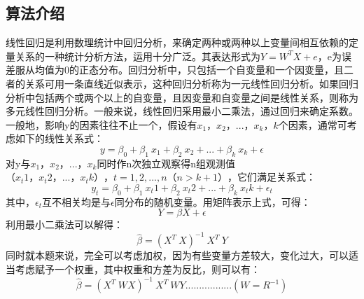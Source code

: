 \documentclass{ctexart}
\begin{document}
\subsection{算法介绍}
线性回归是利用数理统计中回归分析，来确定两种或两种以上变量间相互依赖的定量关系的一种统计分析方法，运用十分广泛。其表达形式为$Y = W^T X + e$，e为误差服从均值为0的正态分布。回归分析中，只包括一个自变量和一个因变量，且二者的关系可用一条直线近似表示，这种回归分析称为一元线性回归分析。如果回归分析中包括两个或两个以上的自变量，且因变量和自变量之间是线性关系，则称为多元线性回归分析。一般来说，线性回归采用最小二乘法，通过回归来确定系数。 \\
一般地，影响y的因素往往不止一个，假设有$x_1，x_2，...，x_k$，$k$个因素，通常可考虑如下的线性关系式：
\begin{equation}
		y = \beta_0 + \beta_1 \ x_1 + \beta_2 \ x_2 + ... + \beta_k \ x_k + \epsilon
\end{equation}
对y与$x_1，x_2，...，x_k$同时作n次独立观察得n组观测值$（x_t1，x_t2，...，x_tk），t=1,2,...,n（n>k+1）$，它们满足关系式：
\begin{equation}
	y_t = \beta_0 + \beta_1 \ x_t1 + \beta_2 \ x_t2 + ... + \beta_k \ x_tk + \epsilon_t
\end{equation}
其中，$\epsilon_t$互不相关均是与$\epsilon$同分布的随机变量。用矩阵表示上式，可得：
\begin{equation}
Y =  \beta X + \epsilon 
\end{equation}
利用最小二乘法可以解得：
\begin{equation}
 \hat{\beta}  = (X^T \ X)^{-1} \ X^T \ Y  
\end{equation}
同时就本题来说，完全可以考虑加权，因为有些变量方差较大，变化过大，可以适当考虑赋予一个权重，其中权重和方差为反比，则可以有：
\begin{equation}
\hat{\beta}  = (X^T \ W X)^{-1} \ X^T \ W Y ................. (W = R^{-1})
\end{equation}
\end{document}
